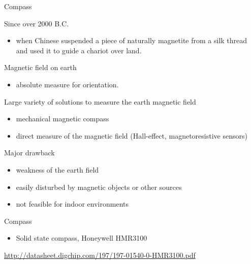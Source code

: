 \documentclass[compress]{beamer}
\providecommand{\tightlist}{%
  \setlength{\itemsep}{0pt}\setlength{\parskip}{0pt}}
\begin{document}
\begin{frame}{Compass}

Since over 2000 B.C.

\begin{itemize}
\tightlist
\item
  when Chinese suspended a piece of naturally magnetite from a silk
  thread and used it to guide a chariot over land.
\end{itemize}

Magnetic field on earth

\begin{itemize}
\tightlist
\item
  absolute measure for orientation.
\end{itemize}

Large variety of solutions to measure the earth magnetic field

\begin{itemize}
\tightlist
\item
  mechanical magnetic compass
\item
  direct measure of the magnetic field (Hall-effect, magnetoresistive
  sensors)
\end{itemize}

Major drawback

\begin{itemize}
\tightlist
\item
  weakness of the earth field
\item
  easily disturbed by magnetic objects or other sources
\item
  not feasible for indoor environments
\end{itemize}

\end{frame}

\begin{frame}{Compass}

\begin{itemize}
\tightlist
\item
  Solid state compass, \eg Honeywell HMR3100
\end{itemize}

\url{http://datasheet.digchip.com/197/197-01540-0-HMR3100.pdf}

\end{frame}
\end{document}

